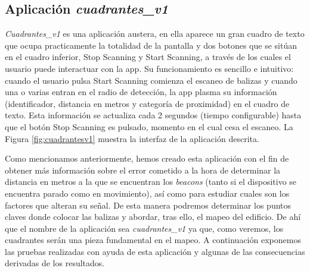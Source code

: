\subsection{Aplicación \textit{cuadrantes\_v1}}
 \textit{Cuadrantes\_v1} es una aplicación austera, en ella aparece un gran cuadro de texto que ocupa practicamente la totalidad de la pantalla y dos botones que se sitúan en el cuadro inferior,  Stop Scanning y Start Scanning, a través de los cuales el usuario puede interactuar con la app. Su funcionamiento es sencillo e intuitivo: cuando el usuario pulsa Start Scanning comienza el escaneo de balizas y cuando una o varias entran en el radio de detección, la app plasma su información (identificador, distancia en metros y categoría de proximidad) en el cuadro de texto. Esta información se actualiza cada 2 segundos (tiempo configurable) hasta que el botón Stop Scanning es pulsado, momento en el cual cesa el escaneo. La Figura \ref{fig:cuadrantesv1} muestra la interfaz de la aplicación descrita.

Como mencionamos anteriormente, hemos creado esta aplicación con el fin de obtener más información sobre el error cometido a la hora de determinar la distancia en metros a la que se encuentran los \textit{beacons} (tanto si el dispositivo se encuentra parado como en movimiento), así como para estudiar cuales son los factores que alteran su señal. De esta manera podremos determinar los puntos claves donde colocar las balizas y abordar, tras ello, el mapeo del edificio. De ahí que el nombre de la aplicación sea \textit{cuadrantes\_v1} ya que, como veremos, los cuadrantes serán una pieza fundamental en el mapeo. A continuación exponemos las pruebas realizadas con ayuda de esta aplicación y algunas de las consecuencias derivadas de los resultados.

